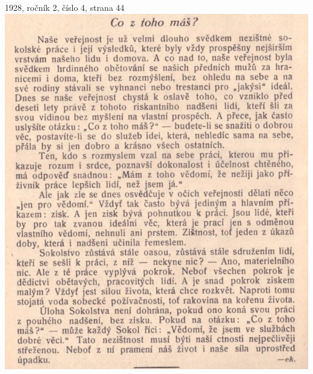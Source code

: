 \documentclass[11pt]{article}
\begin{document}
1928, ročník 2, číslo 4, strana 44 \\
\includegraphics[width=\imagewidth]{original/1928/Skener_20250320 (4).jpg}




\end{document}

